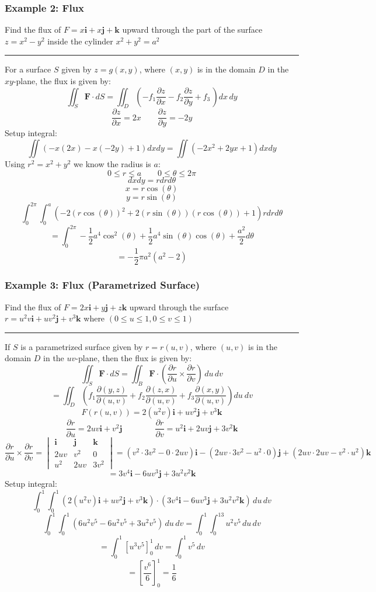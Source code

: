 \subsubsection{Example 2: Flux}
Find the flux of $F=x\mathbf{i}+x\mathbf{j}+\mathbf{k}$ upward through the part of the surface $z=x^2-y^2$
inside the cylinder $x^2+y^2=a^2$

\rule{\textwidth}{0.5pt}

For a surface $S$ given by $z=g(x,y)$, where $(x,y)$ is in the domain $D$ in the $xy$-plane, the flux is given by:
$$\iint_{S}\mathbf{F}\cdot d S=\iint_D\left(-f_{1}\frac{\partial z}{\partial x}-f_{2}\frac{\partial z}{\partial y}+f_{3}\,\right)d x\,d y$$
$$\frac{\partial z}{\partial x}=2x\qquad\frac{\partial z}{\partial y}=-2y$$
Setup integral:
$$\iint (-x(2x)-x(-2y)+1)dxdy=\iint (-2x^2+2yx+1)dxdy$$
Using $r^2=x^2+y^2$ we know the radius is $a$:
$$0\leq r\leq a\qquad 0\leq \theta\leq 2\pi$$
$$dxdy=rdrd\theta$$
$$x=r\cos(\theta)$$
$$y=r\sin(\theta)$$
$$\int_0^{2\pi}\int_0^{a} (-2(r\cos(\theta))^2+2(r\sin(\theta))(r\cos(\theta))+1)rdrd\theta$$
$$=\int_0^{2\pi}-\frac{1}{2} a^4 \cos ^2(\theta)+\frac{1}{2} a^4 \sin (\theta) \cos (\theta)+\frac{a^2}{2}d\theta$$
$$=-\frac{1}{2} \pi  a^2 \left(a^2-2\right)$$

\subsubsection{Example 3: Flux (Parametrized Surface)}
Find the flux of $F=2x\mathbf{i}+y\mathbf{j}+z\mathbf{k}$ upward through the surface $r=u^2v\mathbf{i}+uv^2\mathbf{j}+v^3\mathbf{k}$ where $(0\leq u\leq1,0\leq v\leq1)$ 

\rule{\textwidth}{0.5pt}

If $S$ is a parametrized surface given by $r=r(u,v)$, where $(u,v)$ is in the domain $D$ in the $uv$-plane, then the flux is given by:
$$\iint_{S}\mathbf{F}\cdot d S=\iint_{B}\mathbf{F}\cdot\left({\frac{\partial r}{\partial u}}\times{\frac{\partial r}{\partial v}}\right)\,d u\,d v$$
$$=\iint_D\left(f_1\frac{\partial (y,z)}{\partial (u,v)}+f_2\frac{\partial (z,x)}{\partial (u,v)}+f_3\frac{\partial (x,y)}{\partial (u,v)}\right)du\ dv$$
$$F(r(u,v))=2(u^2v)\mathbf{i}+uv^2\mathbf{j}+v^3\mathbf{k}$$
$$\frac{\partial r}{\partial u}=2uv\mathbf{i}+v^2\mathbf{j}\qquad\qquad\frac{\partial r}{\partial v}=u^2\mathbf{i}+2uv\mathbf{j}+3v^2\mathbf{k}$$
$${\frac{\partial r}{\partial u}}\times{\frac{\partial r}{\partial v}}=\begin{vmatrix}
  \mathbf{i}&\mathbf{j}&\mathbf{k}\\ 
  2uv&v^2&0\\
  u^2&2uv&3v^2
\end{vmatrix}=(v^2\cdot 3v^2-0\cdot 2uv)\mathbf{i}-(2uv\cdot 3v^2-u^2\cdot 0)\mathbf{j}+(2uv\cdot 2uv-v^2\cdot u^2)\mathbf{k}$$
$$=3v^4\mathbf{i}-6uv^3\mathbf{j}+3u^2v^2\mathbf{k}$$
Setup integral:
$$\int_{0}^1\int_0^1(2(u^2v)\mathbf{i}+uv^2\mathbf{j}+v^3\mathbf{k})\cdot\left(3v^4\mathbf{i}-6uv^3\mathbf{j}+3u^2v^2\mathbf{k}\right)\,d u\,d v$$
$$\int_{0}^1\int_0^1(6u^2v^5-6u^2v^5+3u^2v^5)\,d u\,d v=\int_{0}^1\int_0^13u^2v^5\,d u\,d v$$
$$=\int_{0}^1\left[u^3v^5\right]_0^1\,d v=\int_{0}^1v^5\,d v$$
$$=\left[\displaystyle\frac{v^6}{6}\right]_0^1=\boxed{\frac{1}{6}}$$

